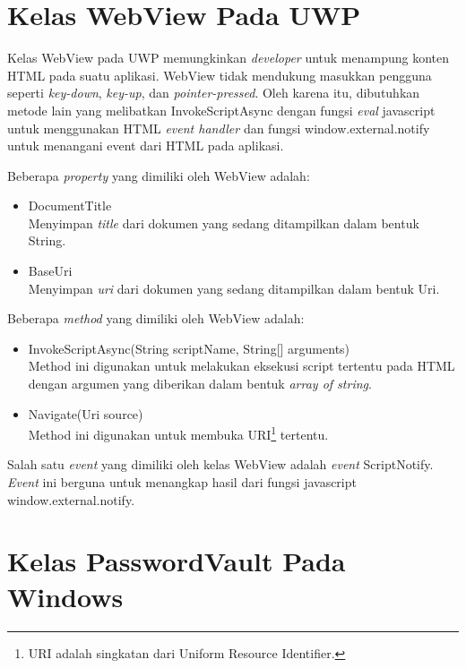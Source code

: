 \section{Kelas WebView Pada UWP}
\label{sec:webview}

Kelas WebView pada UWP memungkinkan \textit{developer} untuk menampung konten HTML pada suatu aplikasi\cite{WinAPI:2016}. WebView tidak mendukung masukkan pengguna seperti \textit{key-down}, \textit{key-up}, dan \textit{pointer-pressed}. Oleh karena itu, dibutuhkan metode lain yang melibatkan InvokeScriptAsync dengan fungsi \textit{eval} javascript untuk menggunakan HTML \textit{event handler} dan fungsi window.external.notify untuk menangani event dari HTML pada aplikasi.

Beberapa \textit{property} yang dimiliki oleh WebView adalah:

\begin{itemize}
    \item{DocumentTitle\\Menyimpan \textit{title} dari dokumen yang sedang ditampilkan dalam bentuk String.}
    \item{BaseUri\\Menyimpan \textit{uri} dari dokumen yang sedang ditampilkan dalam bentuk Uri.}
\end{itemize}

Beberapa \textit{method} yang dimiliki oleh WebView adalah:

\begin{itemize}
    \item{InvokeScriptAsync(String scriptName, String[] arguments)\\Method ini digunakan untuk melakukan eksekusi script tertentu pada HTML dengan argumen yang diberikan dalam bentuk \textit{array of string}.}
    \item{Navigate(Uri source)\\Method ini digunakan untuk membuka URI\footnote{URI adalah singkatan dari Uniform Resource Identifier.} tertentu.}
\end{itemize}

Salah satu \textit{event} yang dimiliki oleh kelas WebView adalah \textit{event} ScriptNotify. \textit{Event} ini berguna untuk menangkap hasil dari fungsi javascript window.external.notify.



\section{Kelas PasswordVault Pada Windows}
\label{sec:passwordvault}

